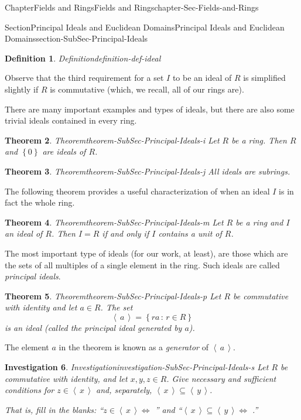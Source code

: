 \documentclass[oneside,10pt,]{book}
\numberwithin{equation}{section}
\newcommand{\ideal}[1]{\left\langle\, #1 \,\right\rangle}
\newcommand{\set}[1]{\left\{ {#1} \right\}}
\newcommand{\setof}[2]{{\left\{#1\,\colon\,#2\right\}}}
\newtheorem{theorem}{Theorem}[section]
\newtheorem{definition}[theorem]{Definition}
\newtheorem{investigation}[theorem]{Investigation}
\begin{document}
\begin{chapterptx}{Chapter}{Fields and Rings}{}{Fields and Rings}{}{}{chapter-Sec-Fields-and-Rings}
\begin{sectionptx}{Section}{Principal Ideals and Euclidean Domains}{}{Principal Ideals and Euclidean Domains}{}{}{section-SubSec-Principal-Ideals}
\begin{definition}{Definition}{}{definition-def-ideal}
\begin{enumerate}
\end{enumerate}
%
\end{definition}
Observe that the third requirement for a set \(I\) to be an ideal of \(R\) is simplified slightly if \(R\) is commutative (which, we recall, all of our rings are).%
\par
There are many important examples and types of ideals, but there are also some trivial ideals contained in every ring.%
\begin{theorem}{Theorem}{}{}{theorem-SubSec-Principal-Ideals-i}%
Let \(R\) be a ring. Then \(R\) and \(\set{0}\) are ideals of \(R\).%
\end{theorem}
\begin{theorem}{Theorem}{}{}{theorem-SubSec-Principal-Ideals-j}%
All ideals are subrings.%
\end{theorem}
The following theorem provides a useful characterization of when an ideal \(I\) is in fact the whole ring.%
\begin{theorem}{Theorem}{}{}{theorem-SubSec-Principal-Ideals-m}%
Let \(R\) be a ring and \(I\) an ideal of \(R\). Then \(I = R\) if and only if \(I\) contains a unit of \(R\).%
\end{theorem}
The most important type of ideals (for our work, at least), are those which are the sets of all multiples of a single element in the ring. Such ideals are called \emph{principal ideals}.%
\begin{theorem}{Theorem}{}{}{theorem-SubSec-Principal-Ideals-p}%
Let \(R\) be commutative with identity and let \(a\in R\). The set%
\begin{equation*}
\ideal{a} = \setof{ra}{r\in R}
\end{equation*}
is an ideal (called the \emph{principal ideal generated by \(a\)}).%
\end{theorem}
The element \(a\) in the theorem is known as a \emph{generator} of \(\ideal{a}\).%
\begin{investigation}{Investigation}{}{investigation-SubSec-Principal-Ideals-s}%
Let \(R\) be commutative with identity, and let \(x,y,z\in R\). Give necessary and sufficient conditions for \(z\in \ideal{x}\) and, separately, \(\ideal{x} \subseteq \ideal{y}\).%
\par
That is, fill in the blanks: ``\(z\in \ideal{x} \Leftrightarrow\) \textunderscore{}\textunderscore{}\textunderscore{}\textunderscore{}\textunderscore{}\textunderscore{}\textunderscore{}\textunderscore{}\textunderscore{}'' and ``\(\ideal{x}\subseteq \ideal{y} \Leftrightarrow\) \textunderscore{}\textunderscore{}\textunderscore{}\textunderscore{}\textunderscore{}\textunderscore{}\textunderscore{}\textunderscore{}\textunderscore{}.''%

\end{investigation}
\end{sectionptx}
\end{chapterptx}
\end{document}
